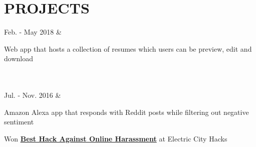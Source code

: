 \documentclass[]{richard-dang}
\begin{document}
\begin{tabularcv}
\begin{tabitemize}
                    \end{tabitemize} 
\end{tabularcv}   

\section*{PROJECTS}
\medbreak
\begin{tabularcv}
    Feb. - \newline 
    May 2018   &   
                    \href{https://github.com/Richard-Dang/FindMyResume}{
                    }
                    \begin{tabitemize}
                        \item Web app that hosts a collection of resumes which users can be preview, edit and download
                    \end{tabitemize} 
                    \\[\vspacepar]\\[\vspacepar]
    Jul. -  \newline 
    Nov. 2016   &   \href{https://github.com/Richard-Dang/AlexaBuddy}{
                    }
                    \begin{tabitemize}
                        \item Amazon Alexa app that responds with Reddit posts while filtering out negative sentiment
                        \item Won \textbf{\href{https://devpost.com/software/alexabuddy}{Best Hack Against Online Harassment}} at Electric City Hacks
                    \end{tabitemize} 
                    \\[\vspacepar]\\[\vspacepar]
\end{tabularcv}   
\end{document}
